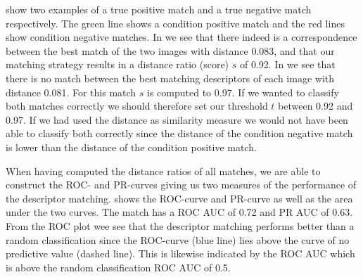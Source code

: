 \documentclass[thesis.tex]{subfiles}
\begin{document}
 show two examples of a true positive match and a true negative match respectively. The green line shows a condition positive match and the red lines show condition negative matches. In  we see that there indeed is a correspondence between the best match of the two images with distance 0.083, and that our matching strategy results in a distance ratio (score) $s$ of 0.92. In  we see that there is no match between the best matching descriptors of each image with distance 0.081. For this match $s$ is computed to 0.97. If we wanted to classify both matches correctly we should therefore set our threshold $t$ between 0.92 and 0.97. If we had used the distance as similarity measure we would not have been able to classify both correctly since the distance of the condition negative match is lower than the distance of the condition positive match.

When having computed the distance ratios of all matches, we are able to construct the ROC- and PR-curves giving us two measures of the performance of the descriptor matching.  shows the ROC-curve  and PR-curve  as well as the area under the two curves. The match has a ROC AUC of 0.72 and PR AUC of 0.63. From the ROC plot wee see that the descriptor matching performs better than a random classification since the ROC-curve (blue line) lies above the curve of no predictive value (dashed line). This is likewise indicated by the ROC AUC which is above the random classification ROC AUC of 0.5.
\end{document}
